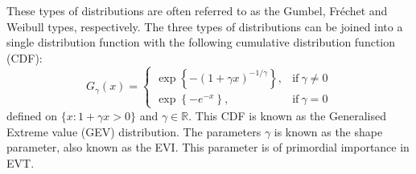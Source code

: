 These types of distributions are often referred to as the Gumbel, Fréchet and Weibull types, respectively.
The three types of distributions can be joined into a single distribution function with the following cumulative distribution function (CDF):
\begin{equation}\label{gev1}
G_{\gamma}(x) = 
\begin{cases}
 \exp\left\{ -\left( 1+\gamma x \right)^{-1/\gamma} \right \}, & \text{if}\ \gamma\neq0 \\
 \exp\left\{-e^{-x} \right\}, & \text{if}\ \gamma=0
\end{cases}
\end{equation}defined on $\{x: 1+\gamma x > 0\}$ and $\gamma \in \mathbb{R}$.
This CDF is known as the Generalised Extreme value (GEV) distribution. The parameters $\gamma$ is known as the shape parameter, also known as the EVI. This parameter is of primordial importance in EVT.

